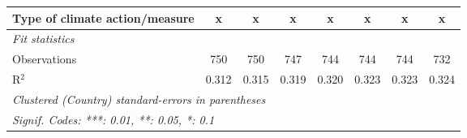 \begin{table}[htbp]
\begin{tabular}{lccccccc}
      Type of climate action/measure                                   & x            & x             & x             & x             & x             & x             & x\\  
      \midrule \emph{Fit statistics}\\
      Observations                                                     & 750          & 750           & 747           & 744           & 744           & 744           & 732\\  
      R$^2$                                                            & 0.312        & 0.315         & 0.319         & 0.320         & 0.323         & 0.323         & 0.324\\  
      \midrule
      \multicolumn{8}{l}{\emph{Clustered (Country) standard-errors in parentheses}}\\
      \multicolumn{8}{l}{\emph{Signif. Codes: ***: 0.01, **: 0.05, *: 0.1}}\\
   \end{tabular}
\end{table}


